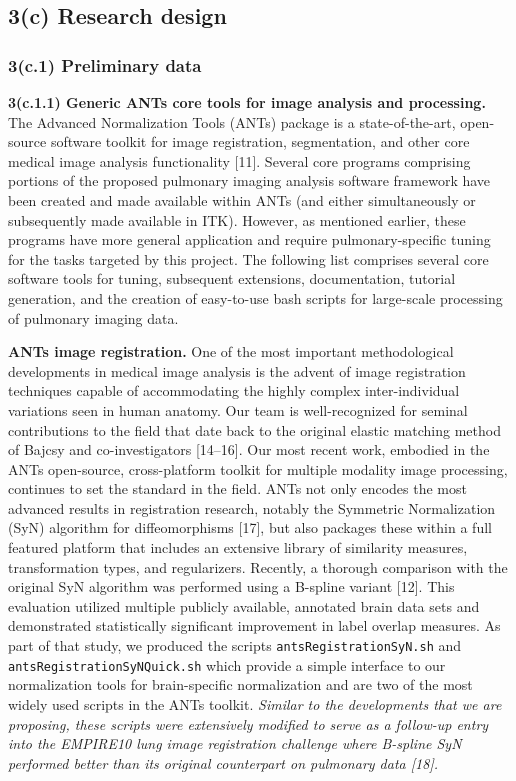 \documentclass[11pt,]{article}
\begin{document}
\subsection{\texorpdfstring{\textbf{3(c) Research
design}}{3(c) Research design}}\label{c-research-design}

\subsubsection{3(c.1) Preliminary data}\label{c.1-preliminary-data}

\textbf{3(c.1.1) Generic ANTs core tools for image analysis and
processing.} The Advanced Normalization Tools (ANTs) package is a
state-of-the-art, open-source software toolkit for image registration,
segmentation, and other core medical image analysis functionality
{[}11{]}. Several core programs comprising portions of the proposed
pulmonary imaging analysis software framework have been created and made
available within ANTs (and either simultaneously or subsequently made
available in ITK). However, as mentioned earlier, these programs have
more general application and require pulmonary-specific tuning for the
tasks targeted by this project. The following list comprises several
core software tools for tuning, subsequent extensions, documentation,
tutorial generation, and the creation of easy-to-use bash scripts for
large-scale processing of pulmonary imaging data.

\textbf{ANTs image registration.} One of the most important
methodological developments in medical image analysis is the advent of
image registration techniques capable of accommodating the highly
complex inter-individual variations seen in human anatomy. Our team is
well-recognized for seminal contributions to the field that date back to
the original elastic matching method of Bajcsy and co-investigators
{[}14--16{]}. Our most recent work, embodied in the ANTs open-source,
cross-platform toolkit for multiple modality image processing, continues
to set the standard in the field. ANTs not only encodes the most
advanced results in registration research, notably the Symmetric
Normalization (SyN) algorithm for diffeomorphisms {[}17{]}, but also
packages these within a full featured platform that includes an
extensive library of similarity measures, transformation types, and
regularizers. Recently, a thorough comparison with the original SyN
algorithm was performed using a B-spline variant {[}12{]}. This
evaluation utilized multiple publicly available, annotated brain data
sets and demonstrated statistically significant improvement in label
overlap measures. As part of that study, we produced the scripts
\texttt{antsRegistrationSyN.sh} and \texttt{antsRegistrationSyNQuick.sh}
which provide a simple interface to our normalization tools for
brain-specific normalization and are two of the most widely used scripts
in the ANTs toolkit. \emph{Similar to the developments that we are
proposing, these scripts were extensively modified to serve as a
follow-up entry into the EMPIRE10 lung image registration challenge
where B-spline SyN performed better than its original counterpart on
pulmonary data {[}18{]}.}
\end{document}
